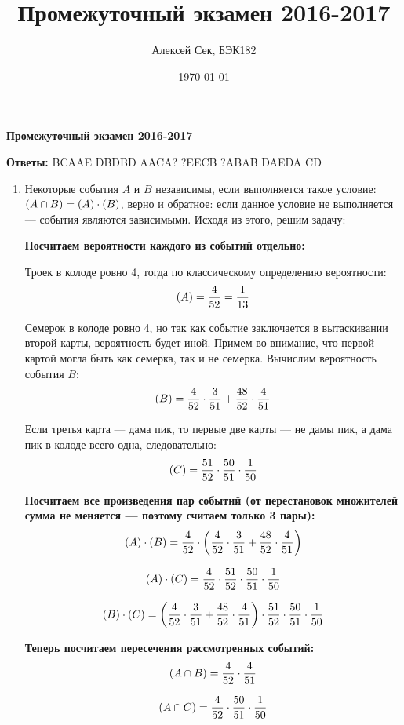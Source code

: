 \documentclass[a4paper]{article} %
\title{Промежуточный экзамен 2016-2017}
\author{Алексей Сек, БЭК182}
\date{\today}
\let\P\relax
\DeclareMathOperator{\P}{\mathbb{P}}
\begin{document}
\maketitle

\textbf{Промежуточный экзамен 2016-2017}

\textbf{Ответы:}
BCAAE DBDBD AACA? ?EECB ?ABAB DAEDA CD


\begin{enumerate}

    \item
    Некоторые события $A$ и $B$ независимы, если выполняется такое условие:
    $ \P(A \cap B) = \P(A) \cdot \P(B) $, верно и обратное: если данное условие не выполняется — события являются зависимыми. Исходя из этого, решим задачу:
    
    \textbf{Посчитаем вероятности каждого из событий отдельно:}
    
    Троек в колоде ровно 4, тогда по классическому определению вероятности:
    \[ 
    \P(A) = \frac{4}{52} = \frac{1}{13} 
    \]
    
    Семерок в колоде ровно 4, но так как событие заключается в вытаскивании второй карты, вероятность будет иной.
    Примем во внимание, что первой картой могла быть как семерка, так и не семерка.
    Вычислим вероятность события $B$: 
    \[
    \P(B) = \frac{4}{52}\cdot\frac{3}{51} + \frac{48}{52}\cdot\frac{4}{51} 
    \]
    
    Если третья карта — дама пик, то первые две карты — не дамы пик, а дама пик в колоде всего одна, следовательно:
    \[ 
    \P(C) = \frac{51}{52}\cdot\frac{50}{51}\cdot\frac{1}{50} 
    \]
    
    \textbf{Посчитаем все произведения пар событий (от перестановок множителей сумма не меняется — поэтому считаем только 3 пары):}
    \[
    \P(A) \cdot \P(B) = \frac{4}{52}\cdot \left(\frac{4}{52}\cdot\frac{3}{51} + \frac{48}{52}\cdot\frac{4}{51} \right) 
    \]
    
    \[
    \P(A) \cdot \P(C) = \frac{4}{52}\cdot\frac{51}{52}\cdot\frac{50}{51}\cdot\frac{1}{50} 
    \]
    
    \[
    \P(B) \cdot \P(C) = \left(\frac{4}{52}\cdot\frac{3}{51} + \frac{48}{52}\cdot\frac{4}{51}\right)\cdot\frac{51}{52}\cdot\frac{50}{51}\cdot\frac{1}{50}
    \]
    
    \textbf{Теперь посчитаем пересечения рассмотренных событий:}
    \[
    \P(A \cap B) = \frac{4}{52}\cdot\frac{4}{51}
    \]
    
    \[
    \P(A \cap C) = \frac{4}{52}\cdot\frac{50}{51}\cdot\frac{1}{50} 
    \]
    

\end{enumerate}
\end{document}
